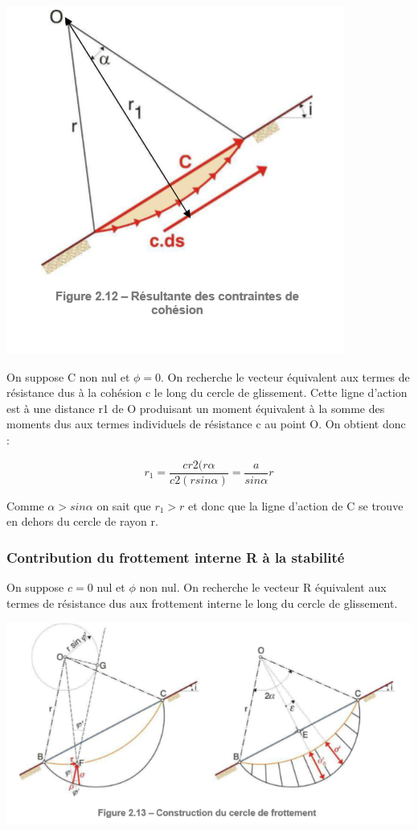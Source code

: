 \begin{center}
\includegraphics [scale=0.5]{pictures/34.PNG}
\end{center}

On suppose C non nul et $\phi = 0$. On recherche le vecteur équivalent aux termes de résistance dus à la cohésion c le long du cercle de glissement. Cette ligne d'action est à une distance r1 de O produisant un moment équivalent à la somme des moments dus aux termes individuels de résistance c au point O. On obtient donc :

$$ r_1 = \frac{cr2(r\alpha}{c2(r sin\alpha)} = \frac{a}{sin \alpha} r $$

Comme $\alpha > sin \alpha$ on sait que $r_1 > r$ et donc que la ligne d'action de C se trouve en dehors du cercle de rayon r.

\subsubsection{Contribution du frottement interne R à la stabilité}

On suppose $c=0$ nul et $\phi$ non nul. On recherche le vecteur R équivalent aux termes de résistance dus aux frottement interne le long du cercle de glissement.

\begin{center}
\includegraphics [scale=0.5]{pictures/Zt.PNG}
\end{center}

